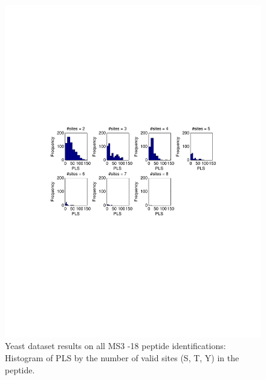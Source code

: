 \begin{figure}[htbp]
\centering %
\includegraphics[trim = 0mm 90mm 20mm 90mm,clip,width=\textwidth]{fig/phospho/allIds/PLS_figs/allIds_PLS_hist_by_num_valid_sites.pdf}
\caption{Yeast dataset results on all MS3 -18 peptide identifications: Histogram of PLS by the number of valid sites (S, T, Y) in the peptide.}
\label{fig:yeast_pls}
\end{figure}

